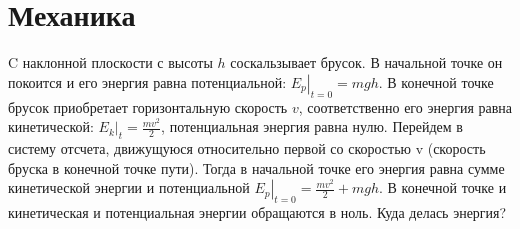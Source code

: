 \chapter{Механика}
\thispagestyle{empty}
\clearpage
\begin{problem}
C наклонной плоскости с высоты $h$ соскальзывает брусок. В начальной точке он покоится и его энергия равна потенциальной: $\left.E_p\right|_{t=0}=mgh$. В конечной точке брусок приобретает горизонтальную скорость $v$, соответственно его энергия равна кинетической: $\left.E_k\right|_{t}=\frac{mv^2}{2}$, потенциальная энергия равна нулю. Перейдем в систему отсчета, движущуюся относительно первой со скоростью v (скорость бруска в конечной точке пути). Тогда в начальной точке его энергия равна сумме кинетической энергии и потенциальной $\left.E_p\right|_{t=0}=\frac{mv^2}{2}+mgh$. В конечной точке и кинетическая и потенциальная энергии обращаются в ноль. Куда делась энергия?
\end{problem}